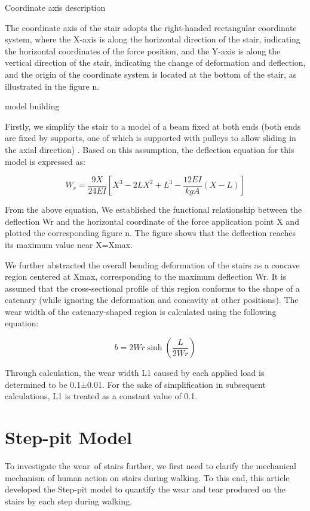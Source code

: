 \documentclass{mcmthesis}
\begin{document}
Coordinate axis description

The coordinate axis of the stair adopts the right-handed rectangular coordinate system, where the X-axis is along the horizontal direction of the stair, indicating the horizontal coordinates of the force position, and the Y-axis is along the vertical direction of the stair, indicating the change of deformation and deflection, and the origin of the coordinate system is located at the bottom of the stair, as illustrated in the figure n.

model building

Firstly, we simplify the stair to a model of a beam fixed at both ends (both ends are fixed by supports, one of which is supported with pulleys to allow sliding in the axial direction) \cite{Levinson1981}\cite{SJZT20241216003}. Based on this assumption, the deflection equation for this model is expressed as:

\[ W_r = \frac{9X}{24EI} \left[ X^3 - 2LX^2 + L^3 - \frac{12EI}{kgA}(X - L) \right] \]

From the above equation, We established the functional relationship between the deflection Wr and the horizontal coordinate of the force application point X and plotted the corresponding figure n. The figure shows that the deflection reaches its maximum value near X=Xmax.


We further abstracted the overall bending deformation of the stairs as a concave region centered at Xmax, corresponding to the maximum deflection Wr. It is assumed that the cross-sectional profile of this region conforms to the shape of a catenary (while ignoring the deformation and concavity at other positions). The wear width of the catenary-shaped region is calculated using the following equation:

\[ b = 2Wr \sinh\left(\frac{L}{2Wr}\right) \]

Through calculation, the wear width L1 caused by each applied load is determined to be 0.1±0.01. For the sake of simplification in subsequent calculations, L1 is treated as a constant value of 0.1.

\section{Step-pit Model}
To investigate the wear of stairs further, we first need to clarify the mechanical mechanism of human action on stairs during walking. To this end, this article developed the Step-pit model
to quantify the wear and tear produced on the stairs by each step during walking.
\end{document}
